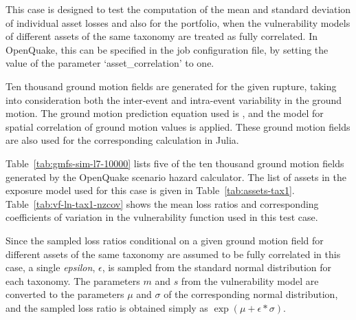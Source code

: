 This case is designed to test the computation of the mean and standard deviation of individual asset losses and also for the portfolio, when the vulnerability models of different assets of the same taxonomy are treated as fully correlated. In OpenQuake, this can be specified in the job configuration file, by setting the value of the parameter `asset\_correlation' to one.

Ten thousand ground motion fields are generated for the given rupture, taking into consideration both the inter-event and intra-event variability in the ground motion. The ground motion prediction equation used is \citet{boore2008}, and the \citet{jayaram2009} model for spatial correlation of ground motion values is applied. These ground motion fields are also used for the corresponding calculation in Julia.

Table~\ref{tab:gmfs-sim-l7-10000} lists five of the ten thousand ground motion fields generated by the OpenQuake scenario hazard calculator. The list of assets in the exposure model used for this case is given in Table~\ref{tab:assets-tax1}. Table~\ref{tab:vf-ln-tax1-nzcov} shows the mean loss ratios and corresponding coefficients of variation in the vulnerability function used in this test case.

Since the sampled loss ratios conditional on a given ground motion field for different assets of the same taxonomy are assumed to be fully correlated in this case, a single \emph{epsilon}, $\epsilon$,  is sampled from the standard normal distribution for each taxonomy. The parameters $m$ and $s$ from the vulnerability model are converted to the parameters $\mu$ and $\sigma$ of the corresponding normal distribution, and the sampled loss ratio is obtained simply as $\exp (\mu + \epsilon * \sigma)$.